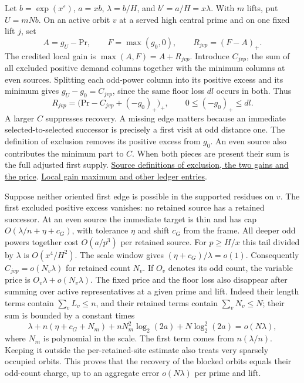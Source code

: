 Let \(b=\exp(x^\varepsilon)\), \(a=xb\), \(\lambda=b/H\), and \(b'=a/H=x\lambda\). With \(m\) lifts, put \(U=mNb\). On an active orbit \(v\) at a served high central prime and on one fixed lift \(j\), set
\[
 A=g_U-\mathrm{Pr},\qquad F=\max(g_0,0),\qquad R_{jvp}=(F-A)_+ .
\]
The credited local gain is \(\max(A,F)=A+R_{jvp}\). Introduce \(C_{jvp}\), the sum of all excluded positive demand columns together with the minimum columns at even sources. Splitting each odd-power column into its positive excess and its minimum gives \(g_U-g_0=C_{jvp}\), since the same floor loss \(dl\) occurs in both. Thus
\[
 R_{jvp}=\bigl(\mathrm{Pr}-C_{jvp}+(-g_0)_+\bigr)_+,
 \qquad 0\le(-g_0)_+\le dl .
\]
A larger \(C\) suppresses recovery. A missing edge matters because an immediate selected-to-selected successor is precisely a first visit at odd distance one. The definition of exclusion removes its positive excess from \(g_0\). An even source also contributes the minimum part to \(C\). When both pieces are present their sum is the full adjusted first supply.
\href{https://github.com/nousentllc/riemann-hypothesis/blob/40e56bab026552e089d7afcfeff08d2defb9c005/src/Formalism/SharpRestriction/GrowthBounds/IsResidueClassZero.lean#L228-L268}{Source definitions of exclusion, the two gains and the price}.
\href{https://github.com/nousentllc/riemann-hypothesis/blob/40e56bab026552e089d7afcfeff08d2defb9c005/src/Formalism/SharpRestriction/GrowthBounds/IsResidueClassZero.lean#L336-L365}{Local gain maximum and other ledger entries}.

Suppose neither oriented first edge is possible in the supported residues on \(v\). The first excluded positive excess vanishes: no retained source has a retained successor. At an even source the immediate target is thin and has cap \(O(\lambda/n+\eta+c_G)\), with tolerance \(\eta\) and shift \(c_G\) from the frame. All deeper odd powers together cost \(O(a/p^3)\) per retained source. For \(p\ge H/x\) this tail divided by \(\lambda\) is \(O(x^4/H^2)\). The scale window gives \((\eta+c_G)/\lambda=o(1)\). Consequently \(C_{jvp}=o(N_v\lambda)\) for retained count \(N_v\). If \(O_v\) denotes its odd count, the variable price is \(O_v\lambda+o(N_v\lambda)\). The fixed price and the floor loss also disappear after summing over active representatives at a given prime and lift. Indeed their length terms contain \(\sum_v L_v\le n\), and their retained terms contain \(\sum_v N_v\le N\); their sum is bounded by a constant times
\[
 \lambda+n(\eta+c_G+N_m)+nN_m^2\log_2(2a)+N\log_2^2(2a)=o(N\lambda),
\]
where \(N_m\) is polynomial in the scale. The first term comes from \(n(\lambda/n)\). Keeping it outside the per-retained-site estimate also treats very sparsely occupied orbits. This proves that the recovery of the blocked orbits equals their odd-count charge, up to an aggregate error \(o(N\lambda)\) per prime and lift.

